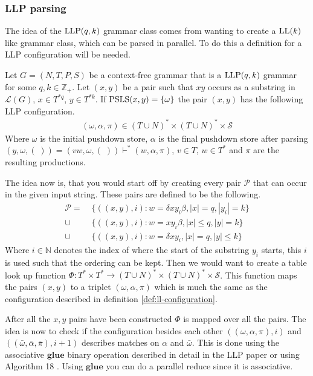 \subsubsection{LLP parsing}
The idea of the $\text{LLP}(q, k)$ grammar class comes from wanting to create a $\text{LL}(k)$ like grammar class, which can be parsed in parallel. To do this a definition for a LLP configuration will be needed.
\begin{definition}
    \label{def:llp-configuration}
    Let $G = (N, T, P, S)$ be a context-free grammar that is a $\text{LLP}(q, k)$ grammar for some $q, k \in \mathbb{Z}_+$. Let $(x, y)$ be a pair such that $xy$ occurs as a substring in $\mathcal{L}(G)$, $x \in T^{*q}$, $y \in T^{*k}$. If $\text{PSLS}(x,y) = \{\omega\}$ the pair $(x, y)$ has the following LLP configuration.
    \begin{align*}
        (\omega, \alpha, \pi) \in (T \cup N)^* \times (T \cup N)^* \times \mathcal{S}
    \end{align*}
    Where $\omega$ is the initial pushdown store, $\alpha$ is the final pushdown store after parsing $(y, \omega, (\;)) = (vw, \omega, (\;)) \vdash^* (w, \alpha, \pi)$, $v \in T$, $w \in T^*$ and $\pi$ are the resulting productions.
\end{definition}
\noindent The idea now is, that you would start off by creating every pair $\mathcal{P}$ that can occur in the given input string. These pairs are defined to be the following.
\begin{align*}
    \mathcal{P} =&\; \{((x, y), i) : w = \delta xy_i \beta, |x| = q, |y_i| = k\} \\
    \cup&\; \{((x, y), i) : w = xy_i \beta, |x| \leq q, |y| = k\} \\
    \cup&\; \{((x, y), i) : w = \delta xy_i, |x| = q, |y| \leq k\}
\end{align*}
Where $i \in \mathbb{N}$ denotes the index of where the start of the substring $y_i$ starts, this $i$ is used such that the ordering can be kept. Then we would want to create a table look up function $\Phi: T^* \times T^* \to (T \cup N)^* \times (T \cup N)^* \times \mathcal{S}$. This function maps the pairs $(x,y)$ to a triplet $(\omega, \alpha, \pi)$ which is much the same as the configuration described in definition \ref{def:ll-configuration}. 

After all the $x, y$ pairs have been constructed $\Phi$ is mapped over all the pairs. The idea is now to check if the configuration besides each other $((\omega, \alpha, \pi), i)$ and $((\bar{\omega}, \bar{\alpha}, \bar{\pi}), i + 1)$ describes matches on $\alpha$ and $\bar{\omega}$. This is done using the associative $\mathbf{glue}$ binary operation described in detail in the LLP paper \cite[7]{Vagner2007} or using Algorithm 18 \cite[18]{Vagner2007}. Using $\mathbf{glue}$ you can do a parallel reduce since it is associative.

